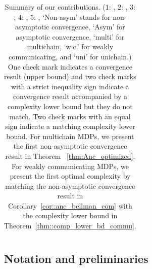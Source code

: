\documentclass{article} %
\newcommand{\cmark}{\ding{51}}%
\begin{document}
\begin{table}[h]
\begin{tabular}{ |c|c|c|c|c|c|c|c|c| }
  \hline
\end{tabular}
    \caption{Summary of our contributions. ($1$: \citet{federgruen1978contraction}, $2$: \citet{van1981stochastic}, $3$: \citet{schweitzer1977asymptotic}, $4$: \citet{schweitzer1979geometric}, $5$: \citet{bertsekas1998new}, `Non-asym' stands for non-asymptotic convergence, `Asym' for asymptotic convergence, `multi' for multichain, `w.c.'  for weakly communicating, and `uni' for unichain.)
   One check mark indicates a convergence result (upper bound) and two check marks with a strict inequality sign indicate a convergence result accompanied by a complexity lower bound but they do not match. Two check marks with an equal sign indicate a matching complexity lower bound.
   For multichain MDPs, we present the first non-asymptotic convergence result in Theorem ~\ref{thm:Anc_optimized}. For weakly communicating MDPs, we present the first optimal complexity by matching the non-asymptotic convergence result in Corollary~\ref{cor::anc_bellman_com} with the complexity lower bound in Theorem~\ref{thm::comp_lower_bd_commu}.
    } 
    \label{fig:comp_prior_rates}
\end{table}


\subsection{Notation and preliminaries}
\end{document}
